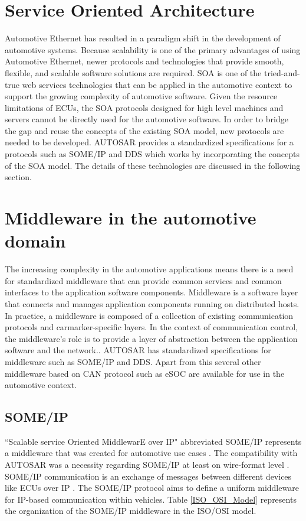 \section{Service Oriented Architecture}
Automotive Ethernet has resulted in a paradigm shift in the development of automotive systems. Because scalability is one of the primary advantages of using Automotive Ethernet, newer protocols and technologies that provide smooth, flexible, and scalable software solutions are required. SOA is one of the tried-and-true web services technologies that can be applied in the automotive context to support the growing complexity of automotive software. Given the resource limitations of ECUs, the SOA protocols designed for high level machines and servers cannot be directly used for the automotive software. In order to bridge the gap and reuse the concepts of the existing SOA model, new protocols are needed to be developed. AUTOSAR provides a standardized specifications for a protocols such as SOME/IP and DDS which works by incorporating the concepts of the SOA model. The details of these technologies are discussed in the following section.   

\section{Middleware in the automotive domain}
The increasing complexity in the automotive applications means there is a need for standardized middleware that can provide common services and common interfaces to the application software components\cite{b_TrendsInACS}. Middleware is a software layer that connects and manages application components running on distributed hosts\cite{b_middleware}. In practice, a middleware is composed of a collection of existing communication protocols and carmarker-specific layers\cite{b_TrendsInACS}. In the context of communication control, the middleware's role is to provide a layer of abstraction between the application software and the network.\cite{b1.4}. AUTOSAR has standardized specifications for middleware such as SOME/IP and DDS\cite{b_TrendsInACS}. Apart from this several other middleware based on CAN protocol such as eSOC\cite{b_TrendsInACS} are available for use in the automotive context. 

\subsection{SOME/IP}
``Scalable service Oriented MiddlewarE over IP" abbreviated SOME/IP represents a middleware that was created for automotive use cases \cite{b1.1}. The compatibility with AUTOSAR was a necessity regarding SOME/IP at least on wire-format level \cite{b1.1}. SOME/IP communication is an exchange of messages between different devices like ECUs over IP \cite{b1.1}. The SOME/IP protocol aims to define a uniform middleware for IP-based communication within vehicles. Table \ref{ISO_OSI_Model} represents the organization of the SOME/IP middleware in the ISO/OSI model.
\par  

